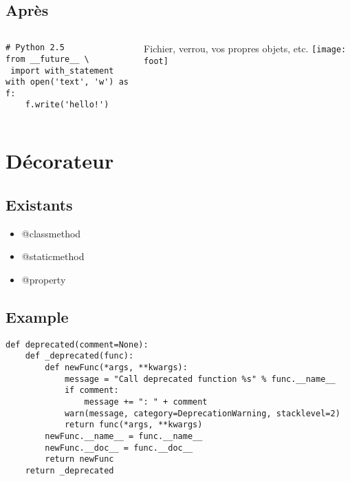 \documentclass[handout]{beamer}
\begin{document}
\subsection{Après}
\begin{frame}[fragile]
    \begin{columns}[c]
        \begin{verbatim}
# Python 2.5
from __future__ \
 import with_statement
with open('text', 'w') as f:
    f.write('hello!')
        \end{verbatim}

        Fichier, verrou, vos propres objets, etc.
        \texttt{[image: foot]}
    \end{columns}
\end{frame}

\section{Décorateur}

\subsection{Existants}
\begin{frame}
    \begin{itemize}
    \item @classmethod
    \item @staticmethod
    \item @property
    \end{itemize}
\end{frame}

\subsection{Example}
\begin{frame}[fragile]
\begin{verbatim}
def deprecated(comment=None):
    def _deprecated(func):
        def newFunc(*args, **kwargs):
            message = "Call deprecated function %s" % func.__name__
            if comment:
                message += ": " + comment
            warn(message, category=DeprecationWarning, stacklevel=2)
            return func(*args, **kwargs)
        newFunc.__name__ = func.__name__
        newFunc.__doc__ = func.__doc__
        return newFunc
    return _deprecated
\end{verbatim}
\end{frame}
\end{document}
